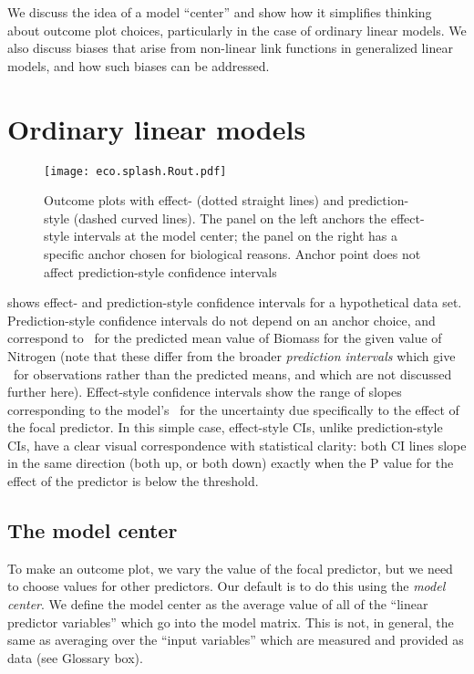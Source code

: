 We discuss the idea of a model “center” and show how it simplifies thinking about outcome plot choices, particularly in the case of ordinary linear models. We also discuss biases that arise from non-linear link functions in generalized linear models, and how such biases can be addressed.


\section{Ordinary linear models}

\begin{figure}
\begin{center}
\texttt{[image: eco.splash.Rout.pdf]}
\end{center}
\caption{Outcome plots with effect- (dotted straight lines) and prediction-style (dashed curved lines). The panel on the left anchors the effect-style intervals at the model center; the panel on the right has a specific anchor chosen for biological reasons. Anchor point does not affect prediction-style confidence intervals}
\end{figure}

 shows effect- and prediction-style confidence intervals for a hypothetical data set. Prediction-style confidence intervals do not depend on an anchor choice, and correspond to \CIs\ for the predicted mean value of Biomass for the given value of Nitrogen (note that these differ from the broader \emph{prediction intervals} which give \CIs\ for observations rather than the predicted means, and which are not discussed further here). Effect-style confidence intervals show the range of slopes corresponding to the model's \CIs\ for the uncertainty due specifically to the effect of the focal predictor. In this simple case, effect-style CIs, unlike prediction-style CIs, have a clear visual correspondence with statistical clarity: both CI lines slope in the same direction (both up, or both down) exactly when the P value for the effect of the predictor is below the threshold.

\subsection{The model center}

To make an outcome plot, we vary the value of the focal predictor, but we need to choose values for other predictors. Our default is to do this using the \emph{model center}. We define the model center as the average value of all of the “linear predictor variables” which go into the model matrix. This is not, in general, the same as averaging over the “input variables” which are measured and provided as data (see Glossary box). 

